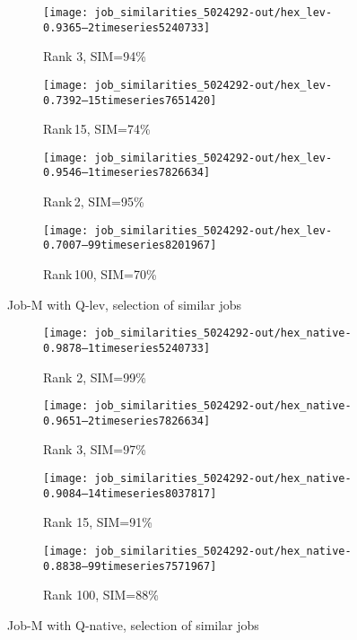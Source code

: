 \documentclass{jhps}
\begin{document}
\begin{figure}[bt]
\begin{subfigure}{0.47\textwidth}
\centering
\texttt{[image: job\_similarities\_5024292-out/hex\_lev-0.9365--2timeseries5240733]}
\caption{Rank 3, SIM=94\%}
\end{subfigure}
\begin{subfigure}{0.47\textwidth}
\texttt{[image: job\_similarities\_5024292-out/hex\_lev-0.7392--15timeseries7651420]}
\caption{Rank\,15, SIM=74\%}
\end{subfigure}

\begin{subfigure}{0.47\textwidth}
\centering
\texttt{[image: job\_similarities\_5024292-out/hex\_lev-0.9546--1timeseries7826634]}
\caption{Rank\,2, SIM=95\%}
\end{subfigure}
\begin{subfigure}{0.47\textwidth}
\centering
\texttt{[image: job\_similarities\_5024292-out/hex\_lev-0.7007--99timeseries8201967]}
\caption{Rank\,100, SIM=70\%}
\end{subfigure}

\caption{Job-M with Q-lev, selection of similar jobs}%
\label{fig:job-M-hex-lev}
\end{figure}



\begin{figure}[bt]
\begin{subfigure}{0.47\textwidth}
\centering
\texttt{[image: job\_similarities\_5024292-out/hex\_native-0.9878--1timeseries5240733]}
\caption{Rank 2, SIM=99\%}
\end{subfigure}
\begin{subfigure}{0.47\textwidth}
\centering
\texttt{[image: job\_similarities\_5024292-out/hex\_native-0.9651--2timeseries7826634]}
\caption{Rank 3, SIM=97\%}
\end{subfigure}
\begin{subfigure}{0.47\textwidth}
\texttt{[image: job\_similarities\_5024292-out/hex\_native-0.9084--14timeseries8037817]}
\caption{Rank 15, SIM=91\%}
\end{subfigure}
\begin{subfigure}{0.47\textwidth}
\centering
\texttt{[image: job\_similarities\_5024292-out/hex\_native-0.8838--99timeseries7571967]}
\caption{Rank 100, SIM=88\%}
\end{subfigure}

\caption{Job-M with Q-native, selection of similar jobs}%
\label{fig:job-M-hex-native}
\end{figure}
\end{document}

